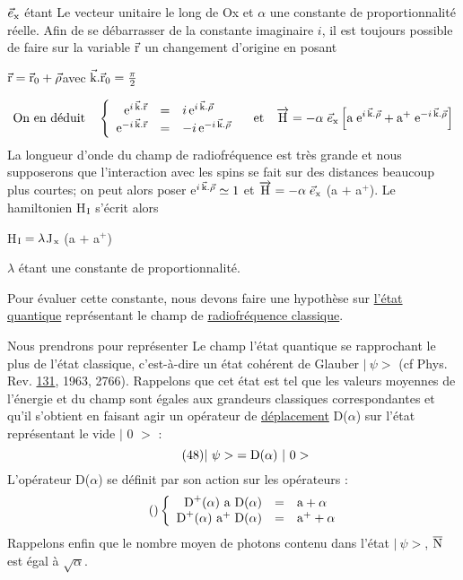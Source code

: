 $\vec{e}_{\text{x}}$ étant Le vecteur unitaire le long de Ox et $\alpha$ une constante de proportionnalité
réelle. Afin de se débarrasser de la constante imaginaire $i$, il est toujours
possible de faire sur la variable $\vec{\text{r}}$ un changement d'origine en posant
\begin{center}
$\vec{\text{r}}=\vec{\text{r}}_0+\vec{\rho}$\quad avec $\vec{\text{k}}.\vec{\text{r}}_0=\frac{\pi}{2}$
\end{center}
\[
\text{On en déduit}\quad\left\{ \begin{array}{rcl}
\text{e}^{i\,\vec{\text{k}}.\vec{\text{r}}} & = & i\,\text{e}^{i\,\vec{\text{k}}.\vec{\rho}} \\
\text{e}^{-i\,\vec{\text{k}}.\vec{\text{r}}} & = & -i\,\text{e}^{-i\,\vec{\text{k}}.\vec{\rho}} \end{array} \right.
\quad
\text{et}\quad\overrightarrow{\text{H}}=-\alpha\;\vec{e}_{\text{x}}\left[\text{a}\;\text{e}^{i\,\vec{\text{k}}.\vec{\rho}}
+\text{a}^+\;\text{e}^{-i\,\vec{\text{k}}.\vec{\rho}}\right]
\]
La longueur d'onde du champ de radiofréquence est très grande et nous supposerons
que l'interaction avec les spins se fait sur des distances beaucoup plus courtes;
on peut alors poser e$^{i\,\vec{\text{k}}.\vec{\rho}}\simeq1$ et
$\overrightarrow{\text{H}}=-\alpha\;\vec{e}_{\text{x}}$ (a $+$ a$^+$).
Le hamiltonien H$_{\text{I}}$ s'écrit alors
\begin{center}
H$_{\text{I}}=\lambda$J$_{\text{x}}$ (a $+$ a$^+$)
\end{center}

$\lambda$ étant une constante de proportionnalité.

Pour évaluer cette constante, nous devons faire une hypothèse sur
\ul{l'état quantique} représentant le champ de \ul{radiofréquence classique}.

Nous prendrons pour représenter Le champ l'état quantique se rapprochant le plus de l'état
classique, c'est-à-dire un état cohérent de
Glauber $|\ \psi >$ (cf Phys. Rev. \ul{131}, 1963, 2766). Rappelons que cet état est tel
que les valeurs moyennes de l'énergie et du champ sont égales aux grandeurs
classiques correspondantes et qu'il s'obtient en faisant agir un opérateur
de \ul{déplacement} D($\alpha$) sur l'état représentant le vide $|$ 0 $>$ :
\[
\tag{48}|\ \psi >\;=\mt{D}(\alpha)\ |\ 0 >
\]
L'opérateur D($\alpha$) se définit par son action sur les opérateurs  :
\[
\tag{}\left\{ \begin{array}{rcl}
\text{D}^+(\alpha)\text{ a D}(\alpha) & = & \text{a}+\alpha \\
\text{D}^+(\alpha)\text{ a}^+\;\text{D}(\alpha) & = & \text{a}^++\alpha \end{array} \right.
\]
Rappelons enfin que le nombre moyen de photons contenu dans l'état $|\ \psi >$,
$\overline{\text{N}}$ est égal à $\sqrt\alpha$.

